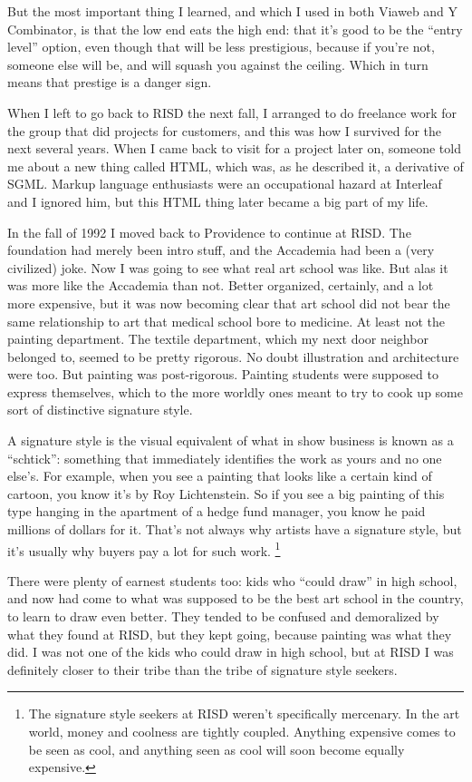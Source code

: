 But the most important thing I learned, and which I used in both Viaweb
and Y Combinator, is that the low end eats the high end: that it's good
to be the ``entry level'' option, even though that will be less
prestigious, because if you're not, someone else will be, and will
squash you against the ceiling. Which in turn means that prestige is a
danger sign.

When I left to go back to RISD the next fall, I arranged to do freelance
work for the group that did projects for customers, and this was how I
survived for the next several years. When I came back to visit for a
project later on, someone told me about a new thing called HTML, which
was, as he described it, a derivative of SGML. Markup language
enthusiasts were an occupational hazard at Interleaf and I ignored him,
but this HTML thing later became a big part of my life.

In the fall of 1992 I moved back to Providence to continue at RISD. The
foundation had merely been intro stuff, and the Accademia had been a
(very civilized) joke. Now I was going to see what real art school was
like. But alas it was more like the Accademia than not. Better
organized, certainly, and a lot more expensive, but it was now becoming
clear that art school did not bear the same relationship to art that
medical school bore to medicine. At least not the painting department.
The textile department, which my next door neighbor belonged to, seemed
to be pretty rigorous. No doubt illustration and architecture were too.
But painting was post-rigorous. Painting students were supposed to
express themselves, which to the more worldly ones meant to try to cook
up some sort of distinctive signature style.

A signature style is the visual equivalent of what in show business is
known as a ``schtick'': something that immediately identifies the work
as yours and no one else's. For example, when you see a painting that
looks like a certain kind of cartoon, you know it's by Roy Lichtenstein.
So if you see a big painting of this type hanging in the apartment of a
hedge fund manager, you know he paid millions of dollars for it. That's
not always why artists have a signature style, but it's usually why
buyers pay a lot for such work. \footnote{The signature style seekers at RISD weren't specifically
mercenary. In the art world, money and coolness are tightly coupled.
Anything expensive comes to be seen as cool, and anything seen as cool
will soon become equally expensive.}

There were plenty of earnest students too: kids who ``could draw'' in
high school, and now had come to what was supposed to be the best art
school in the country, to learn to draw even better. They tended to be
confused and demoralized by what they found at RISD, but they kept
going, because painting was what they did. I was not one of the kids who
could draw in high school, but at RISD I was definitely closer to their
tribe than the tribe of signature style seekers.

